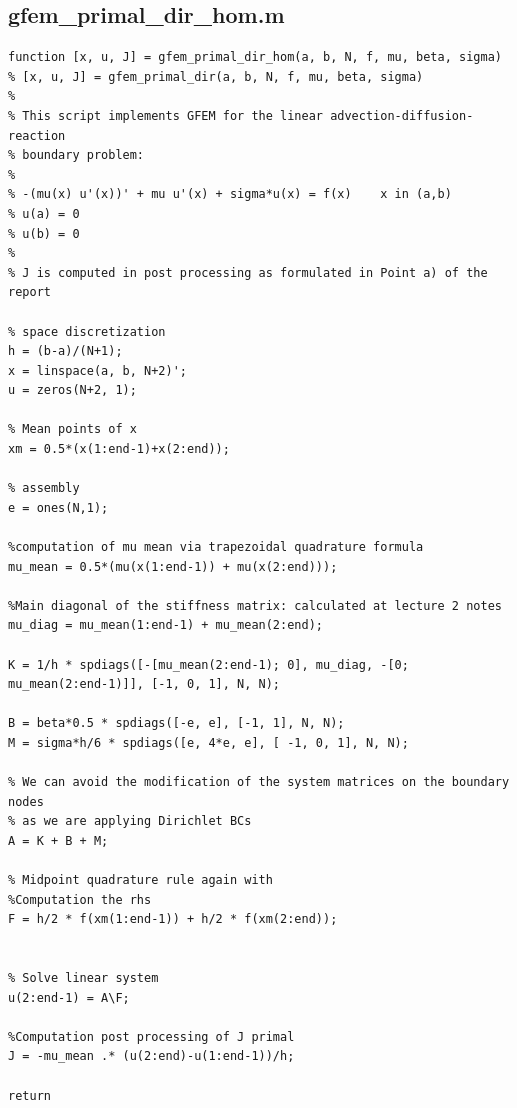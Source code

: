 \documentclass{article}
\begin{document}
\subsection{gfem\_primal\_dir\_hom.m}
\label{code:prim_gfem}
\begin{lstlisting}[style=matlab-editor]
function [x, u, J] = gfem_primal_dir_hom(a, b, N, f, mu, beta, sigma)
% [x, u, J] = gfem_primal_dir(a, b, N, f, mu, beta, sigma)
%
% This script implements GFEM for the linear advection-diffusion-reaction
% boundary problem:
%
% -(mu(x) u'(x))' + mu u'(x) + sigma*u(x) = f(x)    x in (a,b)
% u(a) = 0
% u(b) = 0
% 
% J is computed in post processing as formulated in Point a) of the report

% space discretization
h = (b-a)/(N+1);
x = linspace(a, b, N+2)';
u = zeros(N+2, 1);

% Mean points of x
xm = 0.5*(x(1:end-1)+x(2:end));

% assembly
e = ones(N,1);

%computation of mu mean via trapezoidal quadrature formula
mu_mean = 0.5*(mu(x(1:end-1)) + mu(x(2:end)));

%Main diagonal of the stiffness matrix: calculated at lecture 2 notes
mu_diag = mu_mean(1:end-1) + mu_mean(2:end);

K = 1/h * spdiags([-[mu_mean(2:end-1); 0], mu_diag, -[0; mu_mean(2:end-1)]], [-1, 0, 1], N, N);

B = beta*0.5 * spdiags([-e, e], [-1, 1], N, N);
M = sigma*h/6 * spdiags([e, 4*e, e], [ -1, 0, 1], N, N);

% We can avoid the modification of the system matrices on the boundary nodes 
% as we are applying Dirichlet BCs
A = K + B + M;

% Midpoint quadrature rule again with
%Computation the rhs
F = h/2 * f(xm(1:end-1)) + h/2 * f(xm(2:end));


% Solve linear system
u(2:end-1) = A\F;

%Computation post processing of J primal
J = -mu_mean .* (u(2:end)-u(1:end-1))/h;

return
    
\end{lstlisting}
\end{document}
